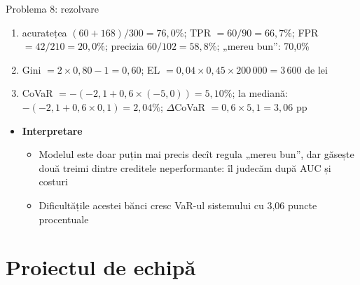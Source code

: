 \begin{frame}{Problema 8: rezolvare}
\itemsize{\footnotesize}
\begin{enumerate}
    \item acuratețea $(60 + 168)/300 = 76{,}0\%$; TPR $= 60/90 = 66{,}7\%$; FPR $= 42/210 = 20{,}0\%$; precizia $60/102 = 58{,}8\%$; „mereu bun”: 70{,}0\%
    \item Gini $= 2 \times 0{,}80 - 1 = 0{,}60$; EL $= 0{,}04 \times 0{,}45 \times 200\,000 = 3\,600$ de lei
    \item CoVaR $= -(-2{,}1 + 0{,}6 \times (-5{,}0)) = 5{,}10\%$; la mediană: $-(-2{,}1 + 0{,}6 \times 0{,}1) = 2{,}04\%$; $\Delta$CoVaR $= 0{,}6 \times 5{,}1 = 3{,}06$ pp
\end{enumerate}
\begin{itemize}
    \item \textbf{Interpretare}
    \begin{itemize}
        \item Modelul este doar puțin mai precis decît regula „mereu bun”, dar găsește două treimi dintre creditele neperformante: îl judecăm după AUC și costuri
        \item Dificultățile acestei bănci cresc VaR-ul sistemului cu 3{,}06 puncte procentuale
    \end{itemize}
\end{itemize}
\end{frame}


\section{Proiectul de echipă}

